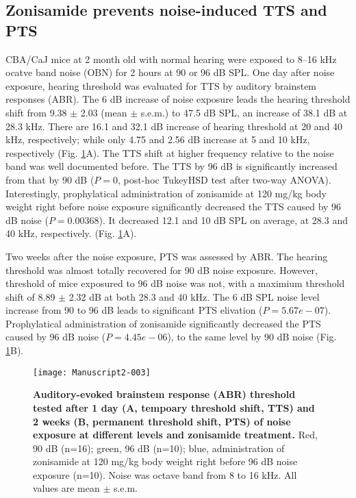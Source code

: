 \documentclass[11pt]{article}
\begin{document}
\subsection {Zonisamide prevents noise-induced TTS and PTS}




CBA/CaJ mice at 2 month old with normal hearing were exposed to 8--16 kHz ocatve band noise (OBN) for 2 hours at 90 or 96 dB SPL. One day after noise exposure, hearing threshold was evaluated for TTS by auditory brainstem responses (ABR). The 6 dB increase of noise exposure leads the hearing threshold shift from 
9.38 
$\pm$ 
2.03 
(mean $\pm$ s.e.m.) to 
47.5 dB SPL, an increase of 38.1 
dB at 28.3 kHz. There are 
16.1 
and 
32.1 
dB increase of hearing threshold at 20 and 40 kHz, respectively; while only 
4.75 
and 
2.56 
dB increase at 5 and 10 kHz, respectively (Fig. \ref{fig:Figure1}A). The TTS shift at higher frequency relative to the noise band was well documented before. The TTS by 96 dB is significantly increased from that by 90 dB 
($P = 0$, post-hoc TukeyHSD test after two-way ANOVA). 
Interestingly, prophylatical administration of zonisamide at 120 mg/kg body weight right before noise exposure significantly decreased the TTS caused by 96 dB noise 
($P = 0.00368$). It decreased 12.1 and 10 dB SPL on average, at 28.3 and 40 kHz, respectively.
(Fig. \ref{fig:Figure1}A).

Two weeks after the noise exposure, PTS was assessed by ABR. The hearing threshold was almost totally recovered for 90 dB noise exposure. However, threshold of mice exposured to 96 dB noise was not, with a maximium threshold shift of 8.89 $\pm$ 2.32 dB at both 28.3 and 40 kHz. The 6 dB SPL noise level increase from 90 to 96 dB leads to significant PTS elivation 
($P = 5.67e-07 $).
Prophylatical administration of zonisamide significantly decreased the PTS caused by 96 dB noise 
($P = 4.45e-06 $), to the same level by 90 dB noise (Fig. \ref{fig:Figure1}B).



\begin{figure}[ht!]
\centering
\texttt{[image: Manuscript2-003]}

\caption{{\bf {Auditory-evoked brainstem response (ABR) threshold tested after 1 day (A, tempoary threshold shift, TTS) and 2 weeks (B, permanent threshold shift, PTS) of noise exposure at different levels and zonisamide treatment.}} Red, 90 dB (n=16); green, 96 dB (n=10); blue, administration of zonisamide at 120 mg/kg body weight right before 96 dB noise exposure (n=10). Noise was octave band from 8 to 16 kHz. All values are mean $\pm$ s.e.m.}
\label{fig:Figure1}
\end{figure}
\end{document}

